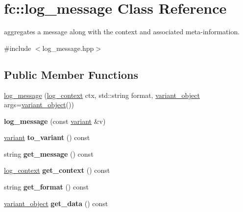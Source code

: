 \hypertarget{classfc_1_1log__message}{}\section{fc\+:\+:log\+\_\+message Class Reference}
\label{classfc_1_1log__message}


aggregates a message along with the context and associated meta-\/information.  




{\ttfamily \#include $<$log\+\_\+message.\+hpp$>$}

\subsection*{Public Member Functions}
\begin{DoxyCompactItemize}
\item 
\mbox{\hyperlink{classfc_1_1log__message_adfaa2f16f929cfb23f15fc4b60b8e530}{log\+\_\+message}} (\mbox{\hyperlink{classfc_1_1log__context}{log\+\_\+context}} ctx, std\+::string format, \mbox{\hyperlink{classfc_1_1variant__object}{variant\+\_\+object}} args=\mbox{\hyperlink{classfc_1_1variant__object}{variant\+\_\+object}}())
\item 
\mbox{\label{classfc_1_1log__message_ae8d2c0335b9d8800c93547659919e008}} 
{\bfseries log\+\_\+message} (const \mbox{\hyperlink{classfc_1_1variant}{variant}} \&v)
\item 
\mbox{\label{classfc_1_1log__message_a8940184d8b014b6c432c30385665a9c0}} 
\mbox{\hyperlink{classfc_1_1variant}{variant}} {\bfseries to\+\_\+variant} () const
\item 
\mbox{\label{classfc_1_1log__message_a512de6d9d8bb1acafa4d98df5bc63063}} 
string {\bfseries get\+\_\+message} () const
\item 
\mbox{\label{classfc_1_1log__message_a6566f216627b8eb68472c8924dc6434f}} 
\mbox{\hyperlink{classfc_1_1log__context}{log\+\_\+context}} {\bfseries get\+\_\+context} () const
\item 
\mbox{\label{classfc_1_1log__message_ad966a7abc653c4e9a253d8352acf8c40}} 
string {\bfseries get\+\_\+format} () const
\item 
\mbox{\label{classfc_1_1log__message_af68127555870f9aa5d06f7c2db9f1d32}} 
\mbox{\hyperlink{classfc_1_1variant__object}{variant\+\_\+object}} {\bfseries get\+\_\+data} () const
\end{DoxyCompactItemize}


